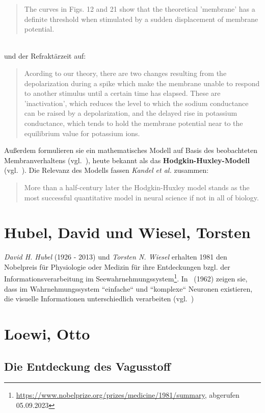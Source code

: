 \blockquote[{\cite[535]{HH52}}]{
    The curves in Figs. 12 and 21 show that the theoretical 'membrane' has a definite threshold when stimulated by a sudden displacement of membrane potential.
}\\

\noindent
und der Refraktärzeit auf:

\blockquote[{\cite[532]{HH52}}]{
    Acording to our theory, there are two changes resulting from the depolarization during a spike which make the membrane unable to respond to another stimulus until a certain time has elapsed. These are 'inactivation', which reduces the level to which the sodium conductance can be raised by a depolarization, and the delayed rise in potassium conductance, which tends to hold the membrane potential near to the equilibrium value for potassium ions.
}

Außerdem formulieren sie ein mathematisches Modell auf Basis des beobachteten Membranverhaltens (vgl.~\cite[501, Fig. 1.]{HH52}), heute bekannt als das \textbf{Hodgkin-Huxley-Modell} (vgl.~\cite[144]{Koc98}).
 Die Relevanz des Modells fassen \textit{Kandel et al.} zusammen:

\blockquote[{\cite[156]{KSJ+13}}]{
    More than a half-century later the Hodgkin-Huxley model stands as the most successful quantitative model in neural science if not in all of biology.
}



\section{Hubel, David und Wiesel, Torsten}\label{appendix:hubelwiesel}

\textit{David H. Hubel} (1926 - 2013) und \textit{Torsten N. Wiesel} erhalten 1981 den Nobelpreis für Physiologie oder Medizin für ihre Entdeckungen bzgl. der Informationsverarbeitung im Seewahrnehmungssystem\footnote{
    \url{https://www.nobelprize.org/prizes/medicine/1981/summary}, abgerufen 05.09.2023
}.
In~\cite{HW62} (1962) zeigen sie, dass im Wahrnehmungssystem ``einfache`` und ``komplexe`` Neuronen existieren, die visuelle Informationen unterschiedlich verarbeiten (vgl.~\cite[2819]{Wur09})

\section{Loewi, Otto}\label{appendix:loewi}
\subsection*{Die Entdeckung des Vagusstoff}

